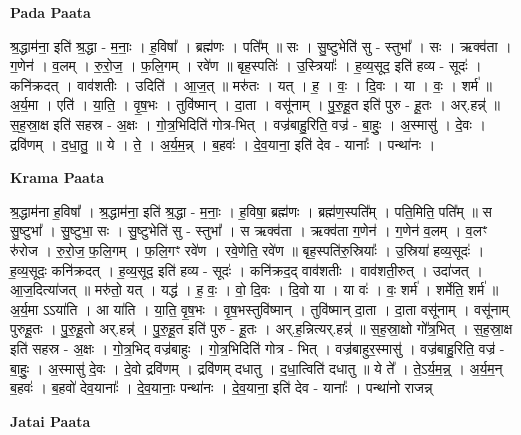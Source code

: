 \documentclass[17pt]{extarticle}
\begin{document}
\textbf{Pada Paata} \newline

श्र॒द्धाम॑ना॒ इति॑ श्र॒द्धा - म॒नाः॒ । ह॒विषा᳚ । ब्रह्म॑णः । पति᳚म् ॥ सः । सु॒ष्टुभेति॑ सु - स्तुभा᳚ । सः । ऋक्व॑ता । ग॒णेन॑ । व॒लम् । रु॒रो॒ज॒ । फ॒लि॒गम् । रवे॑ण ॥ बृह॒स्पतिः॑ । उ॒स्त्रियाः᳚ । ह॒व्य॒सूद॒ इति॑ हव्य - सूदः॑ । कनि॑क्रदत् । वाव॑शतीः । उदिति॑ । आ॒ज॒त् ॥ मरु॑तः । यत् । ह॒ । वः॒ । दि॒वः । या । वः॒ । शर्म॑ ॥ अ॒र्य॒मा । एति॑ । या॒ति॒ । वृ॒ष॒भः । तुवि॑ष्मान् । दा॒ता । वसू॑नाम् । पु॒रु॒हू॒त इति॑ पुरु - हू॒तः । अर्.हन्न्॑ ॥ स॒ह॒स्रा॒क्ष इति॑ सहस्र - अ॒क्षः । गो॒त्र॒भिदिति॑ गोत्र-भित् । वज्र॑बाहु॒रिति॒ वज्र॑ - बा॒हुः॒ । अ॒स्मासु॑ । दे॒वः । द्रवि॑णम् । द॒धा॒तु॒ ॥ ये । ते॒ । अ॒र्य॒म॒न्न् । ब॒हवः॑ । दे॒व॒याना॒ इति॑ देव - यानाः᳚ । पन्था॑नः ।  \newline


\textbf{Krama Paata} \newline

श्र॒द्धाम॑ना ह॒विषा᳚ । श्र॒द्धाम॑ना॒ इति॑ श्र॒द्धा - म॒नाः॒ । ह॒विषा॒ ब्रह्म॑णः । ब्रह्म॑ण॒स्पति᳚म् । पति॒मिति॒ पति᳚म् ॥ स सु॒ष्टुभा᳚ । सु॒ष्टुभा॒ सः । सु॒ष्टुभेति॑ सु - स्तुभा᳚ । स ऋक्व॑ता । ऋक्व॑ता ग॒णेन॑ । ग॒णेन॑ व॒लम् । व॒लꣳ रु॑रोज । रु॒रो॒ज॒ फ॒लि॒गम् । फ॒लि॒गꣳ रवे॑ण । रवे॒णेति॒ रवे॑ण ॥ बृह॒स्पति॑रु॒स्रियाः᳚ । उ॒स्रिया॑ हव्य॒सूदः॑ । ह॒व्य॒सूदः॒ कनि॑क्रदत् । ह॒व्य॒सूद॒ इति॑ हव्य - सूदः॑ । कनि॑क्रद॒द् वाव॑शतीः । वाव॑शती॒रुत् । उदा॑जत् । आ॒ज॒दित्या॑जत् ॥ मरु॑तो॒ यत् । यद्ध॑ । ह॒ वः॒ । वो॒ दि॒वः । दि॒वो या । या वः॑ । वः॒ शर्म॑ । शर्मेति॒ शर्म॑ ॥ अ॒र्य॒मा ऽऽया॑ति । आ या॑ति । या॒ति॒ वृ॒ष॒भः । वृ॒ष॒भस्तुवि॑ष्मान् । तुवि॑ष्मान् दा॒ता । दा॒ता वसू॑नाम् । वसू॑नाम् पुरुहू॒तः । पु॒रु॒हू॒तो अर्.हन्न्॑ । पु॒रु॒हू॒त इति॑ पुरु - हू॒तः । अर्.ह॒न्नित्यर्.हन्न्॑ ॥ स॒ह॒स्रा॒क्षो गो᳚त्र॒भित् । स॒ह॒स्रा॒क्ष इति॑ सहस्र - अ॒क्षः । गो॒त्र॒भिद् वज्र॑बाहुः । गो॒त्र॒भिदिति॑ गोत्र - भित् । वज्र॑बाहुर॒स्मासु॑ । वज्र॑बाहु॒रिति॒ वज्र॑ - बा॒हुः॒ । अ॒स्मासु॑ दे॒वः । दे॒वो द्रवि॑णम् । द्रवि॑णम् दधातु । द॒धा॒त्विति॑ दधातु ॥ ये ते᳚ । ते॒ऽर्य॒म॒न्न्॒ । अ॒र्य॒म॒न् ब॒हवः॑ । ब॒हवो॑ देव॒यानाः᳚ । दे॒व॒यानाः॒ पन्था॑नः । दे॒व॒याना॒ इति॑ देव - यानाः᳚ । पन्था॑नो राजन्न् \newline

\textbf{Jatai Paata} \newline
\end{document}
